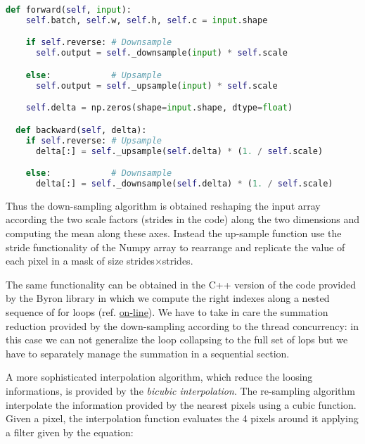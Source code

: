 \documentclass{standalone}
\begin{document}
\begin{lstlisting}[language=Python, caption=NumPyNet version of Upsampling function, label=code:py_upsample]
  def forward(self, input):
    self.batch, self.w, self.h, self.c = input.shape

    if self.reverse: # Downsample
      self.output = self._downsample(input) * self.scale

    else:            # Upsample
      self.output = self._upsample(input) * self.scale

    self.delta = np.zeros(shape=input.shape, dtype=float)

  def backward(self, delta):
    if self.reverse: # Upsample
      delta[:] = self._upsample(self.delta) * (1. / self.scale)

    else:            # Downsample
      delta[:] = self._downsample(self.delta) * (1. / self.scale)


\end{lstlisting}

Thus the down-sampling algorithm is obtained reshaping the input array according the two scale factors (\textsf{strides} in the code) along the two dimensions and computing the mean along these axes.
Instead the up-sample function use the stride functionality of the \textsf{Numpy} array to rearrange and replicate the value of each pixel in a mask of size \textsf{strides}$\times$\textsf{strides}.

The same functionality can be obtained in the \textsf{C++} version of the code provided by the \textsf{Byron} library in which we compute the right indexes along a nested sequence of for loops (ref. \href{https://github.com/Nico-Curti/Byron/blob/master/src/upsample_layer.cpp}{on-line}).
We have to take in care the summation reduction provided by the down-sampling according to the thread concurrency: in this case we can not generalize the loop collapsing to the full set of lops but we have to separately manage the summation in a sequential section.

A more sophisticated interpolation algorithm, which reduce the loosing informations, is provided by the \emph{bicubic interpolation}.
The re-sampling algorithm interpolate the information provided by the nearest pixels using a cubic function.
Given a pixel, the interpolation function evaluates the 4 pixels around it applying a filter given by the equation:
\end{document}
